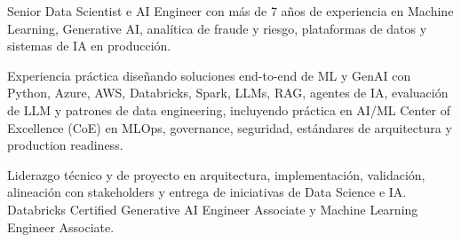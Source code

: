 
{\small\color{cvtext}%
\noindent Senior Data Scientist e AI Engineer con más de 7 años de experiencia en Machine Learning, Generative AI, analítica de fraude y riesgo, plataformas de datos y sistemas de IA en producción.\par
\vspace{0.14em}%
\noindent Experiencia práctica diseñando soluciones end-to-end de ML y GenAI con Python, Azure, AWS, Databricks, Spark, LLMs, RAG, agentes de IA, evaluación de LLM y patrones de data engineering, incluyendo práctica en AI/ML Center of Excellence (CoE) en MLOps, governance, seguridad, estándares de arquitectura y production readiness.\par
\vspace{0.14em}%
\noindent Liderazgo técnico y de proyecto en arquitectura, implementación, validación, alineación con stakeholders y entrega de iniciativas de Data Science e IA. Databricks Certified Generative AI Engineer Associate y Machine Learning Engineer Associate.\par
}
